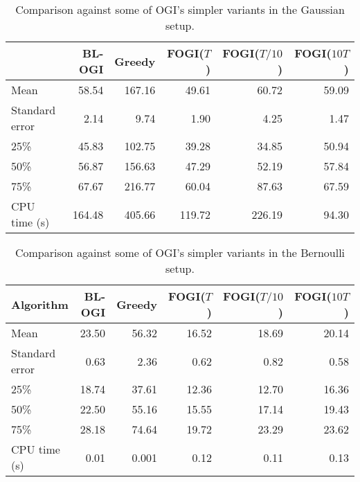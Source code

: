 {\begin{table}[h!]
	\centering
	{\color{blue}
	\begin{tabular}{lrrrrr}
		\toprule
		{} &  \textbf{BL-OGI} &  \textbf{Greedy} &  \textbf{FOGI($T$)} &  \textbf{FOGI($T/10$)} &  \textbf{FOGI($10T$)} \\
		\midrule
		Mean  &   58.54 &  167.16 &      49.61 &         60.72 &        59.09 \\
		Standard error   &    2.14 &    9.74 &       1.90 &          4.25 &         1.47 \\
		25\%   &   45.83 &  102.75 &      39.28 &         34.85 &        50.94 \\
		50\%   &   56.87 &  156.63 &      47.29 &         52.19 &        57.84 \\
		75\%   &   67.67 &  216.77 &      60.04 &         87.63 &        67.59 \\
		CPU time (s)   &  164.48 &  405.66 &     119.72 &        226.19 &        94.30 \\
		\bottomrule
	\end{tabular}
	\caption[Table caption text]{Comparison against some of OGI's simpler variants in the  Gaussian setup.}
	\label{table:gaussian_experiment2}
	}
\end{table}
}
	
\begin{table}[h!]
	\centering
	{\color{blue}
		\begin{tabular}{lrrrrr}
			\toprule
			\textbf{Algorithm} &  \textbf{BL-OGI} &  \textbf{Greedy} &  \textbf{FOGI($T$)} &  \textbf{FOGI($T/10$)} &  \textbf{FOGI($10T$)} \\
			\midrule
			Mean  &   23.50 &   56.32 &      16.52 &         18.69 &        20.14 \\
			Standard error  &    0.63 &    2.36 &       0.62 &          0.82 &         0.58 \\
			25\%   &   18.74 &   37.61 &      12.36 &         12.70 &        16.36 \\
			50\%   &   22.50 &   55.16 &      15.55 &         17.14 &        19.43 \\
			75\%   &   28.18 &   74.64 &      19.72 &         23.29 &        23.62 \\
			CPU time (s)  &   0.01 &  0.001 &   0.12 &         0.11 &      0.13  \\
			\bottomrule
		\end{tabular}
		\caption[Table caption text]{\color{blue}Comparison against some of OGI's simpler variants in the  Bernoulli setup.}
		\label{table:bernoulli_experiment2}
	}
\end{table}

